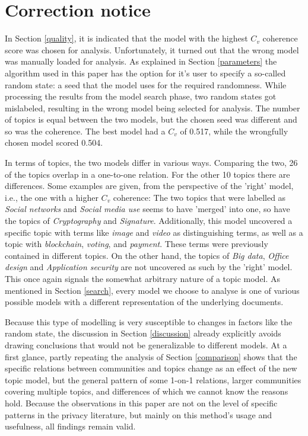 \documentclass[runningheads]{llncs}
\begin{document}
\section*{Correction notice}
In Section \ref{quality}, it is indicated that the model with the highest $C_v$ coherence score was chosen for analysis. Unfortunately, it turned out that the wrong model was manually loaded for analysis. As explained in Section \ref{parameters} the algorithm used in this paper has the option for it's user to specify a so-called random state: a seed that the model uses for the required randomness. While processing the results from the model search phase, two random states got mislabeled, resulting in the wrong model being selected for analysis. The number of topics is equal between the two models, but the chosen seed was different and so was the coherence. The best model had a $C_v$ of 0.517, while the wrongfully chosen model scored 0.504.  

In terms of topics, the two models differ in various ways. Comparing the two, 26 of the topics overlap in a one-to-one relation. For the other 10 topics there are differences. Some examples are given, from the perspective of the 'right' model, i.e., the one with a higher $C_v$ coherence: The two topics that were labelled as \textit{Social networks} and \textit{Social media use} seems to have 'merged' into one, so have the topics of \textit{Cryptography} and \textit{Signature}. Additionally, this model uncovered a specific topic with terms like \textit{image} and \textit{video} as distinguishing terms, as well as a topic with \textit{blockchain}, \textit{voting}, and \textit{payment}. These terms were previously contained in different topics. On the other hand, the topics of \textit{Big data}, \textit{Office design} and \textit{Application security} are not uncovered as such by the 'right' model. This once again signals the somewhat arbitrary nature of a topic model. As mentioned in Section \ref{search}, every model we choose to analyse is one of various possible models with a different representation of the underlying documents.

Because this type of modelling is very susceptible to changes in factors like the random state, the discussion in Section \ref{discussion} already explicitly avoids drawing conclusions that would not be generalizable to different models. At a first glance, partly repeating the analysis of Section \ref{comparison} shows that the specific relations between communities and topics change as an effect of the new topic model, but the general pattern of some 1-on-1 relations, larger communities covering multiple topics, and differences of which we cannot know the reasons hold. Because the observations in this paper are not on the level of specific patterns in the privacy literature, but mainly on this method's usage and usefulness, all findings remain valid.
\end{document}
